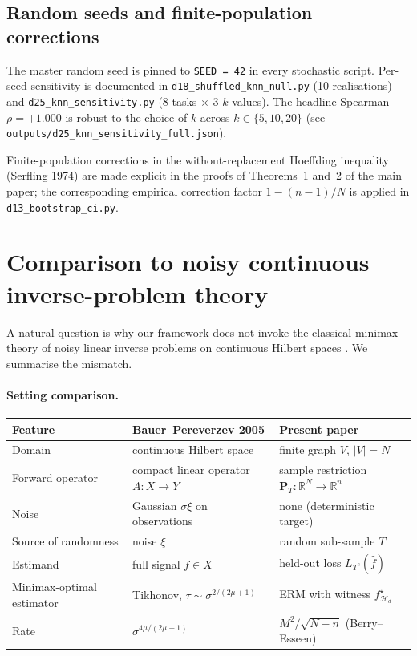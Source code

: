 \documentclass[11pt,a4paper]{article}
\theoremstyle{plain}
\theoremstyle{definition}
\theoremstyle{remark}
\newcommand{\bP}{\mathbf{P}}
\newcommand{\R}{\mathbb{R}}
\newcommand{\Hcal}{\mathcal{H}}
\begin{document}
\subsection{Random seeds and finite-population corrections}

The master random seed is pinned to \texttt{SEED = 42} in every
stochastic script.  Per-seed sensitivity is documented in
\texttt{d18\_shuffled\_knn\_null.py} (10 realisations) and
\texttt{d25\_knn\_sensitivity.py} (8 tasks $\times$ 3 $k$ values).
The headline Spearman $\rho = +1.000$ is robust to the choice of
$k$ across $k \in \{5, 10, 20\}$ (see \texttt{outputs/d25\_knn\_sensitivity\_full.json}).

Finite-population corrections in the without-replacement Hoeffding
inequality (Serfling 1974) are made explicit in the proofs of
Theorems~1 and~2 of the main paper; the corresponding empirical
correction factor $1 - (n-1)/N$ is applied in
\texttt{d13\_bootstrap\_ci.py}.

\section{Comparison to noisy continuous inverse-problem theory}
\label{sec:si-E}

A natural question is why our framework does not invoke the classical
minimax theory of noisy linear inverse problems on continuous Hilbert
spaces \citep{BauerPereverzev2005,Cavalier2008}.  We summarise the
mismatch.

\paragraph{Setting comparison.}

\begin{center}
\begin{tabular}{lll}
\toprule
\textbf{Feature}         & \textbf{Bauer--Pereverzev 2005}            & \textbf{Present paper} \\
\midrule
Domain                   & continuous Hilbert space                    & finite graph $V$, $|V| = N$ \\
Forward operator         & compact linear operator $A : X \to Y$       & sample restriction $\bP_T : \R^N \to \R^n$ \\
Noise                    & Gaussian $\sigma \xi$ on observations       & none (deterministic target) \\
Source of randomness     & noise $\xi$                                 & random sub-sample $T$ \\
Estimand                 & full signal $f \in X$                       & held-out loss $L_{T^c}(\hat f)$ \\
Minimax-optimal estimator & Tikhonov, $\tau \sim \sigma^{2/(2\mu+1)}$ & ERM with witness $f^\star_{\Hcal_d}$ \\
Rate                     & $\sigma^{4\mu/(2\mu+1)}$                    & $M^2/\sqrt{N-n}$ (Berry--Esseen) \\
\bottomrule
\end{tabular}
\end{center}
\end{document}
